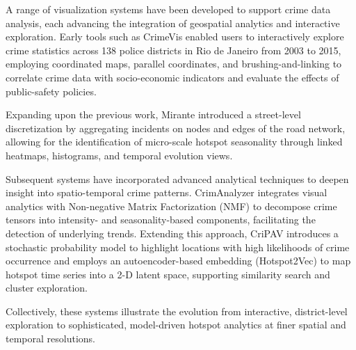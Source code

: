 
A range of visualization systems have been developed to support crime data analysis, each advancing the integration of geospatial analytics and interactive exploration. Early tools such as CrimeVis \citep{Silva2017CrimeVisAI} enabled users to interactively explore crime statistics across 138 police districts in Rio de Janeiro from 2003 to 2015, employing coordinated maps, parallel coordinates, and brushing-and-linking to correlate crime data with socio-economic indicators and evaluate the effects of public-safety policies. 

Expanding upon the previous work, Mirante \citep{Garcia2020MiranteAV} introduced a street-level discretization by aggregating incidents on nodes and edges of the road network, allowing for the identification of micro-scale hotspot seasonality through linked heatmaps, histograms, and temporal evolution views.

Subsequent systems have incorporated advanced analytical techniques to deepen insight into spatio-temporal crime patterns. CrimAnalyzer \citep{Garcia2021CrimAnalyzer} integrates visual analytics with Non-negative Matrix Factorization (NMF) to decompose crime tensors into intensity- and seasonality-based components, facilitating the detection of underlying trends. Extending this approach, CriPAV \citep{Garcia2022CriPAV} introduces a stochastic probability model to highlight locations with high likelihoods of crime occurrence and employs an autoencoder-based embedding (Hotspot2Vec) to map hotspot time series into a 2-D latent space, supporting similarity search and cluster exploration. 

Collectively, these systems illustrate the evolution from interactive, district-level exploration to sophisticated, model-driven hotspot analytics at finer spatial and temporal resolutions.



